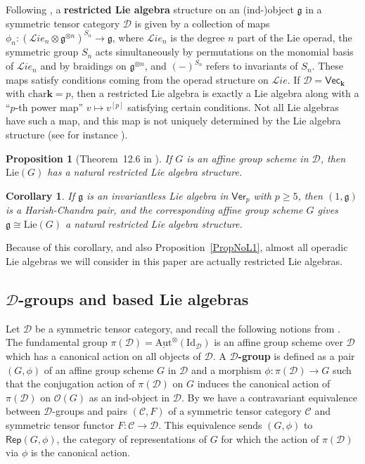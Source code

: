 \documentclass[11pt,a4paper,reqno]{amsart}
\newtheorem{prop}[theorem]{Proposition}
\newtheorem{corollary}[subsection]{Corollary}
\theoremstyle{definition}
\newcommand{\bk}{\mathbf{k}}
\newcommand{\cC}{\mathcal{C}}
\newcommand{\cD}{\mathcal{D}}
\numberwithin{equation}{section}
\newcommand{\charr}{\mathrm{char}}
\newcommand{\Ver}{\mathsf{Ver}}
\newcommand{\Rep}{\mathsf{Rep}}
\newcommand{\cO}{\mathcal{O}}
\newcommand{\fg}{\mathfrak{g}}
\newcommand{\Lie}{\mathrm{Lie}}
\newcommand{\Vecc}{\mathsf{Vec}}
\newcommand{\Id}{\mathrm{Id}}
\newcommand{\Aut}{\mathrm{Aut}}
\begin{document}
Following \cite{BP}, a \textbf{restricted Lie algebra} structure on an (ind-)object $\fg$ in a symmetric tensor category $\cD$ is given by a collection of maps $\phi_n:(\mathcal Lie_n\otimes\fg^{\otimes n})^{S_n}\to\fg$, where $\mathcal Lie_n$ is the degree $n$ part of the Lie operad, the symmetric group $S_n$ acts simultaneously by permutations on the monomial basis of $\mathcal Lie_n$ and by braidings on $\fg^{\otimes n}$, and $(-)^{S_n}$ refers to invariants of $S_n$. These maps satisfy conditions coming from the operad structure on $\mathcal Lie$. If $\cD=\Vecc_\bk$ with $\charr\bk=p$, then a restricted Lie algebra is exactly a Lie algebra along with a ``$p$-th power map'' $v\mapsto v^{[p]}$ satisfying certain conditions. Not all Lie algebras have such a map, and this map is not uniquely determined by the Lie algebra structure (see for instance \cite{Bo}).

\begin{prop}[Theorem~12.6 in \cite{BP}]\label{PropLieRes}
If $G$ is an affine group scheme in $\cD$, then $\Lie(G)$ has a natural restricted Lie algebra structure.
\end{prop}

\begin{corollary}\label{CorLieRes}
If $\fg$ is an invariantless Lie algebra in $\Ver_p$ with $p\geq5$, then $(1,\fg)$ is a Harish-Chandra pair, and the corresponding affine group scheme $G$ gives $\fg\cong\Lie(G)$ a natural restricted Lie algebra structure.
\end{corollary}

Because of this corollary, and also Proposition~\ref{PropNoL1}, almost all operadic Lie algebras we will consider in this paper are actually restricted Lie algebras.

\subsection{$\cD$-groups and based Lie algebras} Let $\cD$ be a symmetric tensor category, and recall the following notions from \cite{incompressible}. The fundamental group $\pi(\cD)=\underline{\Aut}^\otimes(\Id_\cD)$ is an affine group scheme over $\cD$ which has a canonical action on all objects of $\cD$. A \textbf{$\cD$-group} is defined as a pair $(G,\phi)$ of an affine group scheme $G$ in $\cD$ and a morphism $\phi:\pi(\cD)\to G$ such that the conjugation action of $\pi(\cD)$ on $G$ induces the canonical action of $\pi(\cD)$ on $\cO(G)$ as an ind-object in $\cD$. By \cite[Theorem~4.2.1]{incompressible} we have a contravariant equivalence between $\cD$-groups and pairs $(\cC,F)$ of a symmetric tensor category $\cC$ and symmetric tensor functor $F:\cC\to\cD$. This equivalence sends $(G,\phi)$ to $\Rep(G,\phi)$, the category of representations of $G$ for which the action of $\pi(\cD)$ via $\phi$ is the canonical action.
\end{document}
